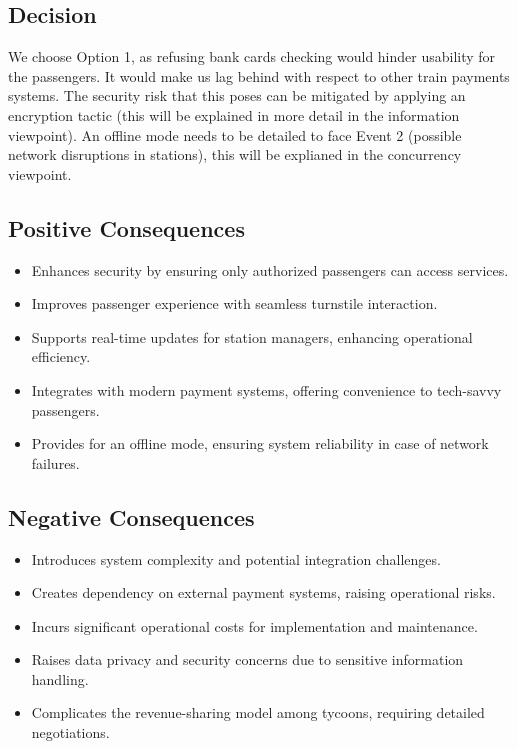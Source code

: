\subsection*{Decision}
We choose Option 1, as refusing bank cards checking would hinder usability for the passengers. It would make us lag behind with respect to other train payments systems. 
The security risk that this poses can be mitigated by applying an encryption tactic (this will be explained in more detail in the information viewpoint).
An offline mode needs to be detailed to face Event 2 (possible network disruptions in stations), this will be explianed in the concurrency viewpoint.

\subsection*{Positive Consequences}
\begin{itemize}
    \item Enhances security by ensuring only authorized passengers can access services.
    \item Improves passenger experience with seamless turnstile interaction.
    \item Supports real-time updates for station managers, enhancing operational efficiency.
    \item Integrates with modern payment systems, offering convenience to tech-savvy passengers.
    \item Provides for an offline mode, ensuring system reliability in case of network failures.
\end{itemize}

\subsection*{Negative Consequences}
\begin{itemize}
    \item Introduces system complexity and potential integration challenges.
    \item Creates dependency on external payment systems, raising operational risks.
    \item Incurs significant operational costs for implementation and maintenance.
    \item Raises data privacy and security concerns due to sensitive information handling.
    \item Complicates the revenue-sharing model among tycoons, requiring detailed negotiations.
\end{itemize}